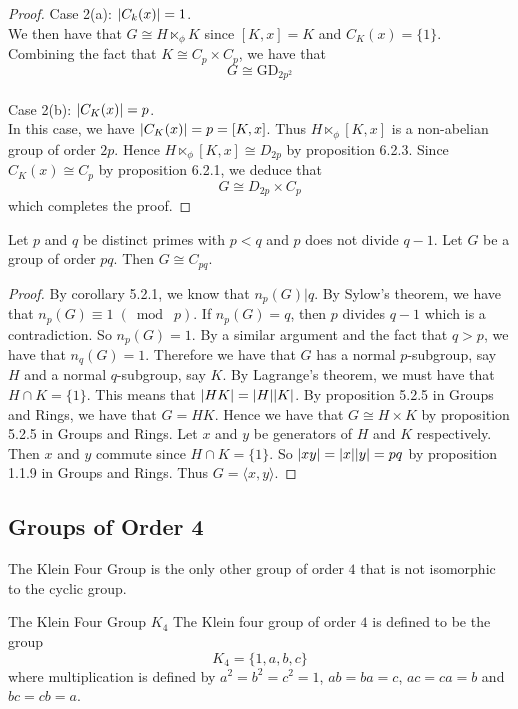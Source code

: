 \documentclass[a4paper]{article}
\begin{document}
\begin{prp}{}{}
\begin{proof}
Case 2(a): $\abs{C_k(x)}=1$. \\
We then have that $G\cong H\ltimes_\phi K$ since $[K,x]=K$ and $C_K(x)=\{1\}$. Combining the fact that $K\cong C_p\times C_p$, we have that $$G\cong\text{GD}_{2p^2}$$~\\

Case 2(b): $\abs{C_K(x)}=p$. \\
In this case, we have $\abs{C_K(x)}=p=[K,x]$. Thus $H\ltimes_\phi[K,x]$ is a non-abelian group of order $2p$. Hence $H\ltimes_\phi[K,x]\cong D_{2p}$ by proposition 6.2.3. Since $C_K(x)\cong C_p$ by proposition 6.2.1, we deduce that $$G\cong D_{2p}\times C_p$$ which completes the proof. 
\end{proof}
\end{prp}

\begin{prp}{}{} Let $p$ and $q$ be distinct primes with $p<q$ and $p$ does not divide $q-1$. Let $G$ be a group of order $pq$. Then $G\cong C_{pq}$. \tcbline
\begin{proof}
By corollary 5.2.1, we know that $n_p(G)|q$. By Sylow's theorem, we have that $n_p(G)\equiv1\;(\bmod\;p)$. If $ n_p(G)=q$, then $p$ divides $q-1$ which is a contradiction. So $n_p(G)=1$. By a similar argument and the fact that $q>p$, we have that $n_q(G)=1$. Therefore we have that $G$ has a normal $p$-subgroup, say $H$ and a normal $q$-subgroup, say $K$. By Lagrange's theorem, we must have that $H\cap K=\{1\}$. This means that $\abs{HK}=\abs{H}\abs{K}$. By proposition 5.2.5 in Groups and Rings, we have that $G=HK$. Hence we have that $G\cong H\times K$ by proposition 5.2.5 in Groups and Rings. Let $x$ and $y$ be generators of $H$ and $K$ respectively. Then $x$ and $y$ commute since $H\cap K=\{1\}$. So $\abs{xy}=\abs{x}\abs{y}=pq$ by proposition 1.1.9 in Groups and Rings. Thus $G=\langle x,y\rangle$. 
\end{proof}
\end{prp}

\subsection{Groups of Order 4}
The Klein Four Group is the only other group of order $4$ that is not isomorphic to the cyclic group. 
\begin{defn}{The Klein Four Group $K_4$}{} The Klein four group of order $4$ is defined to be the group $$K_4=\{1,a,b,c\}$$ where multiplication is defined by $a^2=b^2=c^2=1$, $ab=ba=c$, $ac=ca=b$ and $bc=cb=a$. 
\end{defn}
\end{document}
